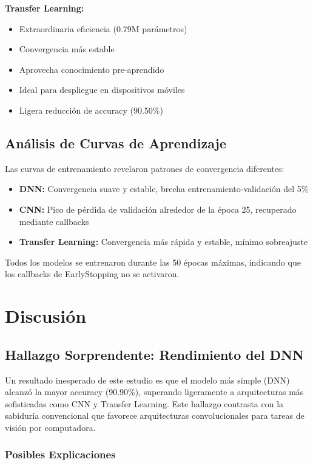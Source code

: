 \documentclass[11pt, a4paper]{article}
\begin{document}
\textbf{Transfer Learning:}
\begin{itemize}
    \item[+] Extraordinaria eficiencia (0.79M parámetros)
    \item[+] Convergencia más estable
    \item[+] Aprovecha conocimiento pre-aprendido
    \item[+] Ideal para despliegue en dispositivos móviles
    \item[-] Ligera reducción de accuracy (90.50\%)
\end{itemize}

\subsection{Análisis de Curvas de Aprendizaje}

Las curvas de entrenamiento revelaron patrones de convergencia diferentes:

\begin{itemize}
    \item \textbf{DNN:} Convergencia suave y estable, brecha entrenamiento-validación del 5\%
    \item \textbf{CNN:} Pico de pérdida de validación alrededor de la época 25, recuperado mediante callbacks
    \item \textbf{Transfer Learning:} Convergencia más rápida y estable, mínimo sobreajuste
\end{itemize}

Todos los modelos se entrenaron durante las 50 épocas máximas, indicando que los callbacks de EarlyStopping no se activaron.

\section{Discusión}

\subsection{Hallazgo Sorprendente: Rendimiento del DNN}

Un resultado inesperado de este estudio es que el modelo más simple (DNN) alcanzó la mayor accuracy (90.90\%), superando ligeramente a arquitecturas más sofisticadas como CNN y Transfer Learning. Este hallazgo contrasta con la sabiduría convencional que favorece arquitecturas convolucionales para tareas de visión por computadora.

\subsubsection{Posibles Explicaciones}
\end{document}
